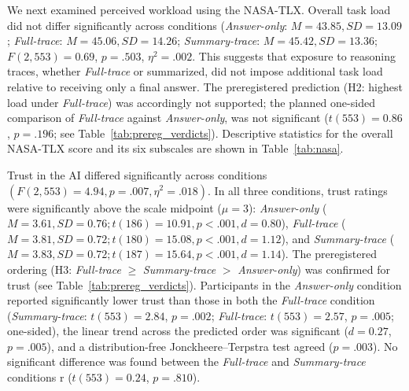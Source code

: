 \documentclass[manuscript,review,anonymous]{acmart}
\newif\ifnewtext
\newcommand{\new}[1]{\ifnewtext\textcolor{colornew}{#1}\else#1\fi}
\begin{document}
We next examined perceived workload using the NASA-TLX. Overall task load did not differ significantly across conditions (\textit{Answer-only}: $M=43.85,SD=13.09$; \textit{Full-trace}: $M=45.06,SD=14.26$; \textit{Summary-trace}: $M=45.42,SD=13.36$; $F(2, 553) = 0.69$, $p = .503$, $\eta^2 =.002$. This suggests that exposure to reasoning traces, whether \textit{Full-trace} or summarized, did not impose additional task load relative to receiving only a final answer. The preregistered prediction (H2: highest load under \textit{Full-trace}) was accordingly not supported; the planned one-sided comparison of \textit{Full-trace} against \textit{Answer-only}, was not significant ($t(553) = 0.86$, $p = .196$; see Table~\ref{tab:prereg_verdicts}). Descriptive statistics for the overall NASA-TLX score and its six subscales are shown in Table~\ref{tab:nasa}.


Trust in the AI differed significantly across conditions $(F(2,553) = 4.94, p = .007,\eta^2 = .018)$. In all three conditions, trust ratings were significantly above the scale midpoint ($\mu = 3$): \textit{Answer-only} ($M = 3.61, SD = 0.76; t(186) = 10.91, p < .001, d = 0.80$), \textit{Full-trace} ($M = 3.81, SD = 0.72; t(180) = 15.08, p < .001, d = 1.12$), and \textit{Summary-trace} ($M = 3.83, SD = 0.72; t(187) = 15.64, p < .001, d = 1.14$). 
The preregistered ordering (H3: \textit{Full-trace} $\geq$ \textit{Summary-trace} $>$ \textit{Answer-only}) was confirmed for trust (see Table~\ref{tab:prereg_verdicts}).  Participants in the \textit{Answer-only } condition reported significantly lower trust than those in both the \textit{Full-trace} condition (\textit{Summary-trace}: $t(553) = 2.84$, $p = .002$; \textit{Full-trace}: $t(553) = 2.57$, $p = .005$; one-sided), the linear trend across the predicted order was significant ($d = 0.27$, $p = .005$), and a distribution-free Jonckheere--Terpstra test agreed ($p = .003$). 
No significant difference was found between the \textit{Full-trace} and \textit{Summary-trace} conditions r ($t(553) = 0.24$, $p = .810$).

\end{document}
